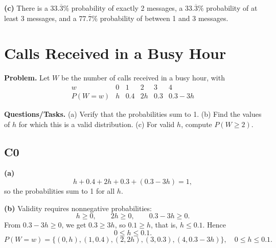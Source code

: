 		\textbf{(c)} There is a $33.\overline{3}\%$ probability of exactly 2 messages, a $33.\overline{3}\%$ probability of at least 3 messages, and a $77.\overline{7}\%$ probability of between 1 and 3 messages.
		
		\section{Calls Received in a Busy Hour}
		
		\textbf{Problem.}
		Let $W$ be the number of calls received in a busy hour, with
		\[
		\begin{array}{c|ccccc}
			w & 0 & 1 & 2 & 3 & 4\\
			\hline
			P(W=w) & h & 0.4 & 2h & 0.3 & 0.3-3h
		\end{array}
		\]
		
		\textbf{Questions/Tasks.}
		(a) Verify that the probabilities sum to 1.
		(b) Find the values of $h$ for which this is a valid distribution.
		(c) For valid $h$, compute $P(W\ge 2)$.
		
		\subsection*{C0}
		
		\textbf{(a)}
		\[
		h+0.4+2h+0.3+(0.3-3h)=1,
		\]
		so the probabilities sum to 1 for all $h$.
		
		\textbf{(b)} Validity requires nonnegative probabilities:
		\[
		h\ge 0,\qquad 2h\ge 0,\qquad 0.3-3h\ge 0.
		\]
		From $0.3-3h\ge 0$, we get $0.3\ge 3h$, so $0.1\ge h$, that is, $h\le 0.1$. Hence
		\[
		0\le h\le 0.1.
		\]
		\[
		P(W=w)=\{(0,h),(1,0.4),(2,2h),(3,0.3),(4,0.3-3h)\},\quad 0\le h\le 0.1.
		\]
		\begin{center}
		\hspace{0.35cm}
		\end{center}
		
